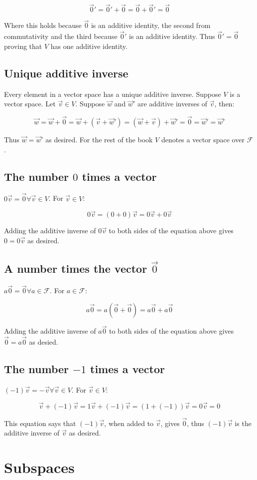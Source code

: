   $$\vec{0}' = \vec{0}'+ \vec{0} = \vec{0} + \vec{0}' = \vec{0}$$

  Where this holds because $\vec{0}$ is an additive identity, the second from commutativity and the third because $\vec{0}'$ is an additive identity.
  Thus $\vec{0}' = \vec{0}$ proving that $V$ has one additive identity.

  \subsection{Unique additive inverse}
  Every element in a vector space has a unique additive inverse.
  Suppose $V$ is a vector space.
  Let $\vec{v}\in V$.
  Suppose $\vec{w}$ and $\vec{w}'$ are additive inverses of $\vec{v}$, then:

  $$\vec{w} = \vec{w} + \vec{0} = \vec{w} + (\vec{v} + \vec{w}') = (\vec{w} + \vec{v}) + \vec{w} ' = \vec{0} = \vec{w}' = \vec{w}'$$

  Thus $\vec{w} = \vec{w}'$ as desired.
  For the rest of the book $V$ denotes a vector space over $\mathcal{F}$.

  \subsection{The number $0$ times a vector}
  $0\vec{v} = \vec{0}\forall \vec{v}\in V$.
  For $\vec{v}\in V$:

  $$0\vec{v} = (0+0)\vec{v} = 0\vec{v} + 0\vec{v}$$

  Adding the additive inverse of $0\vec{v}$ to both sides of the equation above gives $0 = 0\vec{v}$ as desired.

  \subsection{A number times the vector $\vec{0}$}
  $a\vec{0} = \vec{0}\forall a\in\mathcal{F}$.
  For $a\in\mathcal{F}$:

  $$a\vec{0} = a(\vec{0} + \vec{0}) = a\vec{0} + a\vec{0}$$

  Adding the additive inverse of $a\vec{0}$ to both sides of the equation above gives $\vec{0} = a\vec{0}$ as desied.

  \subsection{The number $-1$ times a vector}
  $(-1)\vec{v} = -\vec{v}\forall \vec{v}\in V$.
  For $\vec{v}\in V$:

  $$\vec{v} + (-1)\vec{v} = 1\vec{v} + (-1)\vec{v} = (1 + (-1))\vec{v} = 0\vec{v} = 0$$

  This equation says that $(-1)\vec{v}$, when added to $\vec{v}$, gives $\vec{0}$, thus $(-1)\vec{v}$ is the additive inverse of $\vec{v}$ as desired.

\section{Subspaces}
